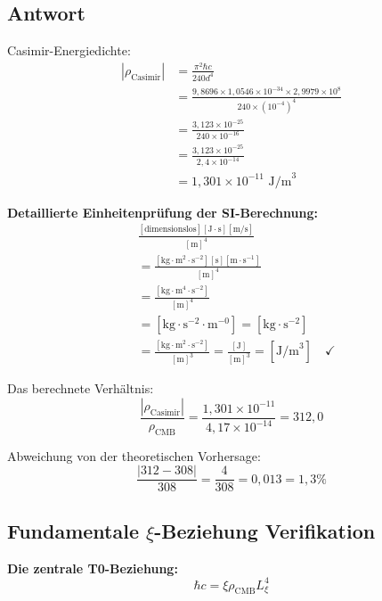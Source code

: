 \documentclass[12pt,a4paper]{article}
\theoremstyle{remark}
\newenvironment{answer}{\subsection*{Antwort}}{\vspace{1em}}
\begin{document}
\begin{answer}
	Casimir-Energiedichte:
	\begin{align}
		|\rho_{\text{Casimir}}| &= \frac{\pi^2 \hbar c}{240 d^4} \\
		&= \frac{9{,}8696 \times 1{,}0546 \times 10^{-34} \times 2{,}9979 \times 10^8}{240 \times (10^{-4})^4} \\
		&= \frac{3{,}123 \times 10^{-25}}{240 \times 10^{-16}} \\
		&= \frac{3{,}123 \times 10^{-25}}{2{,}4 \times 10^{-14}} \\
		&= 1{,}301 \times 10^{-11} \text{ J/m}^3
	\end{align}
	
	\begin{units}
		\textbf{Detaillierte Einheitenprüfung der SI-Berechnung:}
		\begin{align}
			&\frac{[\text{dimensionslos}][\text{J}\cdot\text{s}][\text{m/s}]}{[\text{m}]^4} \\
			&= \frac{[\text{kg}\cdot\text{m}^2\cdot\text{s}^{-2}][\text{s}][\text{m}\cdot\text{s}^{-1}]}{[\text{m}]^4} \\
			&= \frac{[\text{kg}\cdot\text{m}^4\cdot\text{s}^{-2}]}{[\text{m}]^4} \\
			&= [\text{kg}\cdot\text{s}^{-2}\cdot\text{m}^{-0}] = [\text{kg}\cdot\text{s}^{-2}] \\
			&= \frac{[\text{kg}\cdot\text{m}^2\cdot\text{s}^{-2}]}{[\text{m}]^3} = \frac{[\text{J}]}{[\text{m}]^3} = [\text{J/m}^3] \quad \checkmark
		\end{align}
	\end{units}
	
	Das berechnete Verhältnis:
	\begin{equation}
		\frac{|\rho_{\text{Casimir}}|}{\rho_{\text{CMB}}} = \frac{1{,}301 \times 10^{-11}}{4{,}17 \times 10^{-14}} = 312{,}0
	\end{equation}
	
	Abweichung von der theoretischen Vorhersage:
	\begin{equation}
		\frac{|312 - 308|}{308} = \frac{4}{308} = 0{,}013 = 1{,}3\%
	\end{equation}
	
	\subsection{Fundamentale $\xi$-Beziehung Verifikation}
	
	\textbf{Die zentrale T0-Beziehung:}
	\begin{equation}
		\hbar c = \xi \rho_{\text{CMB}} L_\xi^4
	\end{equation}
	

\end{answer}
\end{document}
